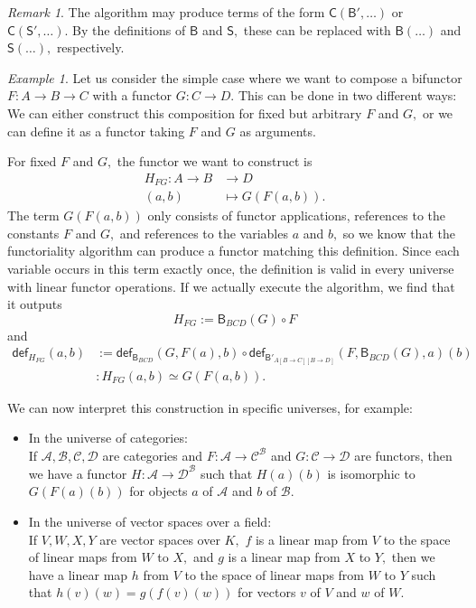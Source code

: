 \documentclass[a4paper]{article}
\theoremstyle{definition}
\theoremstyle{remark}
\newtheorem*{remark}{Remark}
\newtheorem*{example}{Example}
\renewcommand{\equiv}{\simeq}
\newcommand{\A}{\mathcal{A}}
\newcommand{\B}{\mathcal{B}}
\newcommand{\C}{\mathcal{C}}
\newcommand{\D}{\mathcal{D}}
\newcommand{\nm}{\mathsf}
\newcommand{\fndef}[1]{\nm{def}_{#1}}
\newcommand{\combinator}{\nm}
\newcommand{\compFun}{\combinator{B'}}
\newcommand{\revCompFun}{\combinator{B}}
\newcommand{\swapFun}{\combinator{C}}
\newcommand{\substFun}{\combinator{S'}}
\newcommand{\revSubstFun}{\combinator{S}}
\begin{document}
\begin{remark}
  The algorithm may produce terms of the form $\swapFun(\compFun,\ldots)$ or
  $\swapFun(\substFun,\ldots).$ By the definitions of $\revCompFun$ and $\revSubstFun,$
  these can be replaced with $\revCompFun(\ldots)$ and $\revSubstFun(\ldots),$
  respectively.
\end{remark}

\begin{example}
  Let us consider the simple case where we want to compose a bifunctor
  $F : A \to B \to C$ with a functor $G : C \to D.$ This can be done in
  two different ways: We can either construct this composition for fixed but
  arbitrary $F$ and $G,$ or we can define it as a functor taking $F$ and $G$ as
  arguments.
  
  For fixed $F$ and $G,$ the functor we want to construct is
  \begin{align*}
    H_{FG} : A \to B &\to     D\\
             (a,b)   &\mapsto G(F(a,b)).
  \end{align*}
  The term $G(F(a,b))$ only consists of functor applications, references to the
  constants $F$ and $G,$ and references to the variables $a$ and $b,$ so we
  know that the functoriality algorithm can produce a functor matching this
  definition. Since each variable occurs in this term exactly once, the
  definition is valid in every universe with linear functor operations. If we
  actually execute the algorithm, we find that it outputs
  \[H_{FG} := \revCompFun_{BCD}(G) \circ F\]
  and
  \begin{align*}
    \fndef{H_{FG}}(a,b) &:= \fndef{\revCompFun_{BCD}}(G,F(a),b) \circ \fndef{\compFun_{A[B{\to}C][B{\to}D]}}(F,\revCompFun_{BCD}(G),a)(b)\\
                        &: H_{FG}(a,b) \equiv G(F(a,b)).
  \end{align*}

  We can now interpret this construction in specific universes, for example:
  \begin{itemize}
    \item In the universe of categories:\\
    If $\A,\B,\C,\D$ are categories and $F : \A \to \C^\B$ and $G : \C \to \D$
    are functors, then we have a functor $H : \A \to \D^\B$ such that
    $H(a)(b)$ is isomorphic to $G(F(a)(b))$ for objects $a$ of $\A$ and $b$ of
    $\B.$
    \item In the universe of vector spaces over a field:\\
    If $V,W,X,Y$ are vector spaces over $K,$ $f$ is a linear map from $V$
    to the space of linear maps from $W$ to $X,$ and $g$ is a linear map
    from $X$ to $Y,$ then we have a linear map $h$ from $V$ to the space of
    linear maps from $W$ to $Y$ such that $h(v)(w) = g(f(v)(w))$ for vectors
    $v$ of $V$ and $w$ of $W.$
  \end{itemize}


\end{example}
\end{document}
